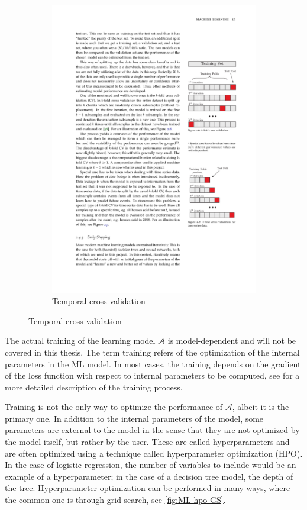 \begin{figure}[htbp]
\begin{subfigure}{.5\textwidth}
        \includegraphics[trim={14.14cm 7.67cm 2.1cm 16.5cm}, clip, width=.8\linewidth]{figures/MasterThesis-cross-validation}
        \caption{Temporal cross validation}
        \label{fig:ML-crossval-temporal}
    \end{subfigure}
\end{figure}

The actual training of the learning model $\mathcal{A}$ is model-dependent and will not be covered in this thesis. The term training refers of the optimization of the internal parameters in the ML model. In most cases, the training depends on the gradient of the loss function with respect to internal parameters to be computed, see \cite{michelsenPhysicistApproachMachine2020} for a more detailed description of the training process.

Training is not the only way to optimize the performance of  $\mathcal{A}$, albeit it is the primary one. In addition to the internal parameters of the model, some parameters are external to the model in the sense that they are not optimized by the model itself, but rather by the user. These are called hyperparameters and are often optimized using a technique called hyperparameter optimization (HPO). In the case of logistic regression, the number of variables to include would be an example of a hyperparameter; in the case of a decision tree model, the depth of the tree. Hyperparameter optimization can be performed in many ways, where the common one is through grid search, see \autoref{fig:ML-hpo-GS}.

